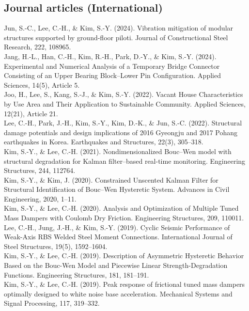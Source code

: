 \documentclass[10pt, a4paper]{article}
\newcommand{\years}[1]{\marginnote{\scriptsize #1}}
\begin{document}
\subsection*{Journal articles (International)}

\noindent
\years{2024}
Jun, S.-C., Lee, C.-H., \& Kim, S.-Y. (2024). Vibration mitigation of modular structures supported by ground-floor piloti. Journal of Constructional Steel Research, 222, 108965.\\
Jang, H.-L., Han, C.-H., Kim, R.-H., Park, D.-Y., \& Kim, S.-Y. (2024). Experimental and Numerical Analysis of a Temporary Bridge Connector Consisting of an Upper Bearing Block–Lower Pin Configuration. Applied Sciences, 14(5), Article 5.\\
\years{2022}
Joo, H., Lee, S., Kang, S.-J., \& Kim, S.-Y. (2022). Vacant House Characteristics by Use Area and Their Application to Sustainable Community. Applied Sciences, 12(21), Article 21. \\
Lee, C.-H., Park, J.-H., Kim, S.-Y., Kim, D.-K., \& Jun, S.-C. (2022). Structural damage potentials and design implications of 2016 Gyeongju and 2017 Pohang earthquakes in Korea. Earthquakes and Structures, 22(3), 305–318.\\
\years{2021}Kim, S.-Y., \& Lee, C.-H. (2021). Nondimensionalized Bouc–Wen model with structural degradation for Kalman filter–based real-time monitoring. Engineering Structures, 244, 112764.
\\
\years{2020}Kim, S.-Y., \& Kim, J. (2020). Constrained Unscented Kalman Filter for Structural Identification of Bouc–Wen Hysteretic System. Advances in Civil Engineering, 2020, 1–11.
\\
Kim, S.-Y., \& Lee, C.-H. (2020). Analysis and Optimization of Multiple Tuned Mass Dampers with Coulomb Dry Friction. Engineering Structures, 209, 110011.
\\
\years{2019}Lee, C.-H., Jung, J.-H., \& Kim, S.-Y. (2019). Cyclic Seismic Performance of Weak-Axis RBS Welded Steel Moment Connections. International Journal of Steel Structures, 19(5), 1592–1604.
\\
Kim, S.-Y., \& Lee, C.-H. (2019). Description of Asymmetric Hysteretic Behavior Based on the Bouc-Wen Model and Piecewise Linear Strength-Degradation Functions. Engineering Structures, 181, 181–191.
\\
Kim, S.-Y., \& Lee, C.-H. (2019). Peak response of frictional tuned mass dampers optimally designed to white noise base acceleration. Mechanical Systems and Signal Processing, 117, 319–332.
\end{document}
